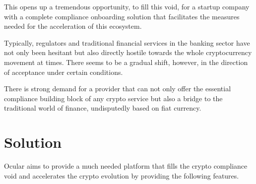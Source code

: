 \documentclass[12pt]{article}
\begin{document}
This opens up a tremendous opportunity, to fill this void, for a startup company with a complete compliance onboarding solution that facilitates the measures needed for the acceleration of this ecosystem. 

Typically, regulators and traditional financial services in the banking sector have not only been hesitant but also directly hostile towards the whole cryptocurrency movement at times. There seems to be a gradual shift, however, in the direction of acceptance under certain conditions. 

There is strong demand for a provider that can not only offer the essential compliance building block of any crypto service but also a bridge to the traditional world of finance, undisputedly based on fiat currency.  

\clearpage
\section{Solution}
Ocular aims to provide a much needed platform that fills the crypto compliance void and accelerates the crypto evolution by providing the following features. 
\end{document}
